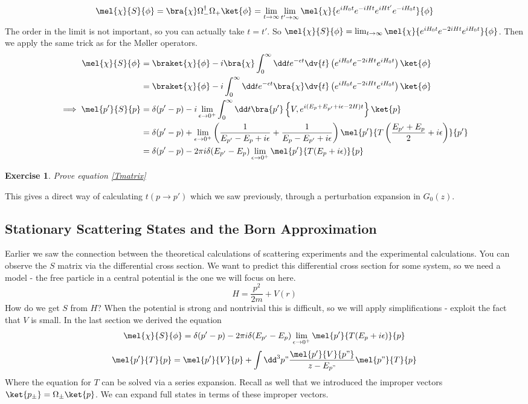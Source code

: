 \documentclass{article}
\newtheorem{exercise}{Exercise}[section]
\begin{document}
\[\mel{\chi}{S}{\phi}=\bra{\chi}\Omega_-^\dagger \Omega_+\ket{\phi} = \lim_{t\to \infty}\lim_{t'\to \infty} \mel{\chi}{e^{iH_0t}e^{-iHt}e^{iHt'}e^{-iH_0t}}{\phi}\]
The order in the limit is not important, so you can actually take $t=t'$. So $\mel{\chi}{S}{\phi} = \lim_{t\to\infty}\mel{\chi}{e^{iH_0t}e^{-2iHt}e^{iH_0t}}{\phi}$. Then we apply the same trick as for the M\o ller operators.
\begin{align}
\mel{\chi}{S}{\phi}&=\braket{\chi}{\phi}-i\bra{\chi}\int_0^\infty \dd t e^{-\epsilon t} \dv{t}\left(e^{iH_0t}e^{-2iHt}e^{iH_0t}\right)\ket{\phi}\\
&= \braket{\chi}{\phi}-i\int_0^\infty \dd t e^{-\epsilon t} \bra{\chi}\dv{t}\left(e^{iH_0t}e^{-2iHt}e^{iH_0t}\right)\ket{\phi}\\
\implies \mel{p'}{S}{p}&= \delta(p'-p)-i\lim_{\epsilon\to0^+}\int_0^\infty \dd t \bra{p'}\left\{V,e^{i(E_p+E_{p'}+i\epsilon-2H)t}\right\}\ket{p}\\
&= \delta(p'-p)+\lim_{\epsilon\to 0^+}\left(\frac{1}{E_{p'}-E_{p}+i\epsilon}+\frac{1}{E_{p}-E_{p'}+i\epsilon}\right)\mel{p'}{T\left(\frac{E_{p'}+E_p}{2}+i\epsilon\right)}{p'}\\
&= \delta(p'-p)-2\pi i \delta(E_{p'}-E_p)\lim_{\epsilon\to 0^+}\mel{p'}{T(E_p+i\epsilon)}{p}\label{Tmatrix}
\end{align}
\begin{exercise}Prove equation \eqref{Tmatrix}\end{exercise}
This gives a direct way of calculating $t(p\to p')$ which we saw previously, through a perturbation expansion in $G_0(z)$.

\subsection{Stationary Scattering States and the Born Approximation}
Earlier we saw the connection between the theoretical calculations of scattering experiments and the experimental calculations. You can observe the $S$ matrix via the differential cross section. We want to predict this differential cross section for some system, so we need a model - the free particle in a central potential is the one we will focus on here. 
\begin{equation}
H=\frac{p^2}{2m}+V(r)
\end{equation}
How do we get $S$ from $H$? When the potential is strong and nontrivial this is difficult, so we will apply simplifications - exploit the fact that $V$ is small. In the last section we derived the equation
\begin{equation}\mel{\chi}{S}{\phi}=\delta(p'-p)-2\pi i \delta(E_{p'}-E_p)\lim_{\epsilon\to 0^+}\mel{p'}{T(E_p+i\epsilon)}{p}\label{scatter}\end{equation}
\begin{equation}\mel{p'}{T}{p}= \mel{p'}{V}{p}+\int \dd^3 p" \frac{\mel{p'}{V}{p"}}{z-E_{p"}}\mel{p"}{T}{p}\end{equation}
Where the equation for $T$ can be solved via a series expansion. Recall as well that we introduced the improper vectors $\ket{p_\pm} = \Omega_\pm \ket{p}$. We can expand full states in terms of these improper vectors. 
\end{document}
